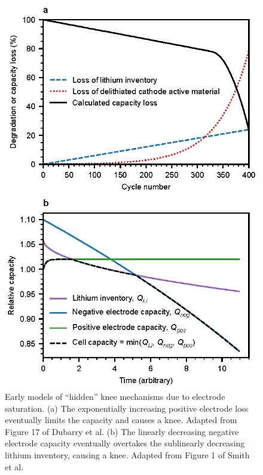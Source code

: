 \documentclass[journal=jpclcd,manuscript=article]{achemso}
\begin{document}
\begin{figure}
\centering
\includegraphics[scale = 1]{figures/electrode_saturation.eps}
\caption{Early models of ``hidden'' knee mechanisms due to electrode saturation. (a) The exponentially increasing positive electrode loss eventually limits the capacity and causes a knee. Adapted from Figure 17 of Dubarry et al.\cite{dubarry_synthesize_2012}
(b) The linearly decreasing negative electrode capacity eventually overtakes the sublinearly decreasing lithium inventory, causing a knee. Adapted from Figure 1 of Smith et al.\cite{smith_life_2017}
}
\label{fig:electrode_sat_simple}
\end{figure}
\end{document}
